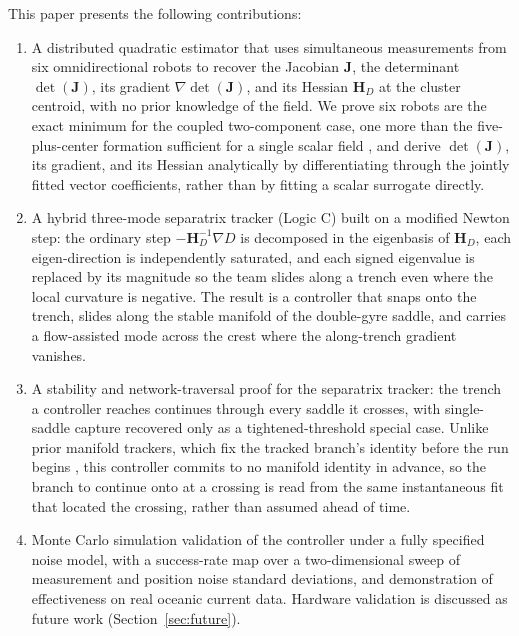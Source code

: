 \documentclass[lettersize,journal]{IEEEtran}
\begin{document}
This paper presents the following contributions:
\begin{enumerate}
    \item A distributed quadratic estimator that uses simultaneous measurements
          from six omnidirectional robots to recover the Jacobian $\mathbf{J}$,
          the determinant $\det(\mathbf{J})$, its gradient
          $\nabla\det(\mathbf{J})$, and its Hessian $\mathbf{H}_D$ at the cluster
          centroid, with no prior knowledge of the field. We prove six robots
          are the exact minimum for the coupled two-component case, one more
          than the five-plus-center formation sufficient for a single scalar
          field \cite{15}, and derive $\det(\mathbf{J})$, its gradient, and its
          Hessian analytically by differentiating through the jointly fitted
          vector coefficients, rather than by fitting a scalar surrogate
          directly.
    \item A hybrid three-mode separatrix tracker (Logic C) built on a
          modified Newton step: the ordinary step
          $-\mathbf{H}_D^{-1}\nabla D$ is decomposed in the eigenbasis of
          $\mathbf{H}_D$, each eigen-direction is independently saturated,
          and each signed eigenvalue is replaced by its magnitude so the
          team slides along a trench even where the local curvature is
          negative. The result is a controller that snaps onto the trench,
          slides along the stable manifold of the double-gyre saddle, and
          carries a flow-assisted mode across the crest where the
          along-trench gradient vanishes.
    \item A stability and network-traversal proof for the separatrix tracker:
          the trench a controller reaches continues through every saddle it
          crosses, with single-saddle capture recovered only as a
          tightened-threshold special case. Unlike prior manifold trackers,
          which fix the tracked branch's identity before the run begins
          \cite{9,10}, this controller commits to no manifold identity in
          advance, so the branch to continue onto at a crossing is read from
          the same instantaneous fit that located the crossing, rather than
          assumed ahead of time.
    \item Monte Carlo simulation validation of the controller under a fully
          specified noise model, with a success-rate map over a two-dimensional
          sweep of measurement and position noise standard deviations, and
          demonstration of effectiveness on real oceanic current data.
          Hardware validation is discussed as future work
          (Section~\ref{sec:future}).
\end{enumerate}
\end{document}
